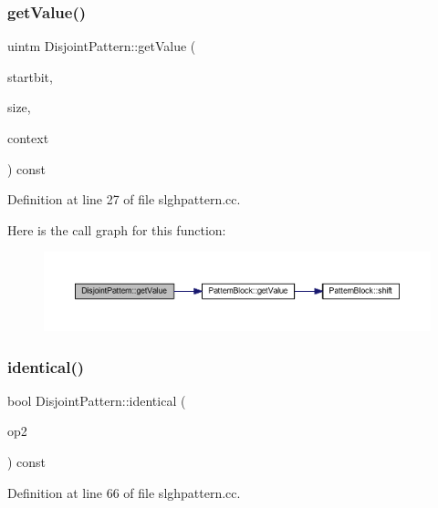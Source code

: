 \subsubsection{\texorpdfstring{getValue()}{getValue()}}
{\footnotesize\ttfamily uintm Disjoint\+Pattern\+::get\+Value (\begin{DoxyParamCaption}\item[{int4}]{startbit,  }\item[{int4}]{size,  }\item[{bool}]{context }\end{DoxyParamCaption}) const}



Definition at line 27 of file slghpattern.\+cc.

Here is the call graph for this function\+:
\nopagebreak
\begin{figure}[H]
\begin{center}
\leavevmode
\includegraphics[width=350pt]{class_disjoint_pattern_aeaef820b4f6fdd9f5af67ee83cdc5a39_cgraph}
\end{center}
\end{figure}
\mbox{\label{class_disjoint_pattern_af075a6468dfdd141511aca9d222af263}} 
\subsubsection{\texorpdfstring{identical()}{identical()}}
{\footnotesize\ttfamily bool Disjoint\+Pattern\+::identical (\begin{DoxyParamCaption}\item[{const \mbox{\hyperlink{class_disjoint_pattern}{Disjoint\+Pattern}} $\ast$}]{op2 }\end{DoxyParamCaption}) const}



Definition at line 66 of file slghpattern.\+cc.

